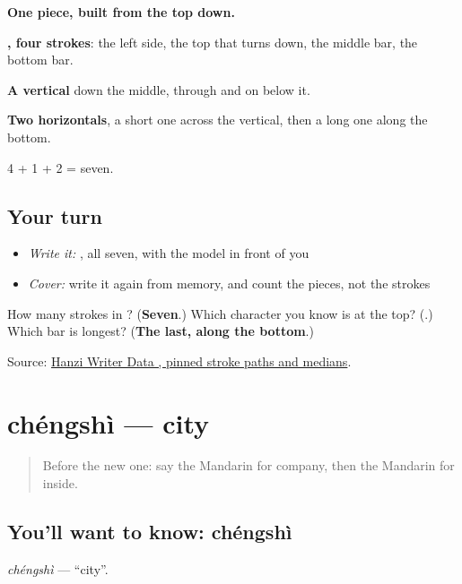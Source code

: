 \begin{quote}
\end{quote}

\textbf{One piece, built from the top down.}

\textbf{, four strokes}: the left side, the top that turns down, the middle bar, the bottom bar.

\textbf{A vertical} down the middle, through  and on below it.

\textbf{Two horizontals}, a short one across the vertical, then a long one along the bottom.

4 + 1 + 2 = seven.

\subsection*{Your turn}
\begin{itemize}
\raggedright
  \item \emph{Write it:} , all seven, with the model in front of you
  \item \emph{Cover:} write it again from memory, and count the pieces, not the strokes
\end{itemize}

\begin{tcolorbox}[breakable,colback=teal!4,colframe=teal!35!black,title={Before you move on}]
How many strokes in ? (\textbf{Seven}.) Which character you know is at the top? (\textbf{}.) Which bar is longest? (\textbf{The last, along the bottom}.)

Source: \href{https://raw.githubusercontent.com/chanind/hanzi-writer-data/68d10a4b21150cae5e1ebbd223eed289cf32d90c/data/\%E9\%87\%8C.json}{Hanzi Writer Data , pinned stroke paths and medians}.
\end{tcolorbox}
\section[chéngshì]{chéngshì — city}

\label{lesson:ZH-C81-chengshi}



\begin{quote}
Before the new one: say the Mandarin for company, then the Mandarin for inside.
\end{quote}

\subsection*{You'll want to know: chéngshì}
\emph{chéngshì} — \textquotedblleft{}city\textquotedblright{}.

